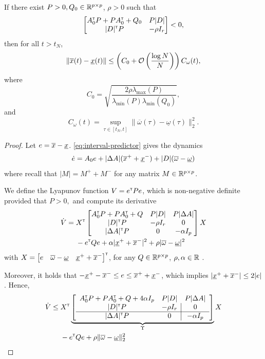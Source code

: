 \begin{subappendices}
	\begin{lemma}
		\begin{leftbar}[lemmabar]
		If there exist $P>0,Q_0\in\mathbb{R}^{p\times p}$, $\rho>0$ such that
		\begin{align*}
		\begin{bmatrix}
		A_0^{\mathsf{\scriptscriptstyle T}} P + P A_0^{\mathsf{\scriptscriptstyle T}} + Q_0 & P|D|  \\
		|D|^{\mathsf{\scriptscriptstyle T}} P & -\rho I_r \\
		\end{bmatrix}< 0,
		\end{align*}
		then for all $t> t_N$,
		\[\|\overline{x}(t) - \underline{x}(t)\| \leq \left(C_0 + \mathcal{O}\left({\frac{\log N}{N}} \right)\right)C_\omega(t), \]
		where $$C_0 = \sqrt{\frac{2\rho\lambda_{\max}(P)}{\lambda_{\min}(P)\lambda_{\min}(Q_0)}},$$ and $$C_\omega(t) = \sup_{\tau\in[t_N,t]} \|\overline{\omega}(\tau) - \underline{\omega}(\tau)\|_2^2.$$
		\end{leftbar}
	\end{lemma}
	\begin{proof}
		Let $e = \overline{x} - \underline{x}$. \eqref{eq:interval-predictor} gives the dynamics
		\begin{align*}
		\dot{e} = A_0e + |\Delta A|(\overline{x}^+ + \underline{x}^-) + |D|(\overline{\omega} - \underline{\omega})
		\end{align*}
		where recall that $|M| = M^+ + M^-$ for any matrix $M\in\mathbb{R}^{p\times p}$.
		
		We define the Lyapunov function $V = e^{\mathsf{\scriptscriptstyle T}} P e$, which is non-negative definite provided that
		$
		P>0,
		$ and compute its derivative
		\begin{align*}
		\dot{V} ={}& X^{\mathsf{\scriptscriptstyle T}}
		\begin{bmatrix}
		A_0^{\mathsf{\scriptscriptstyle T}} P + P A_0^{\mathsf{\scriptscriptstyle T}} + Q & P|D| & P|\Delta A| \\
		|D|^{\mathsf{\scriptscriptstyle T}} P & -\rho I_r & 0\\
		|\Delta A|^{\mathsf{\scriptscriptstyle T}} P & 0 & -\alpha I_p
		\end{bmatrix}
		X\\
		& - e^{\mathsf{\scriptscriptstyle T}} Q e + \alpha |\underline{x}^+ + \overline{x}^-|^2 + \rho |\overline{\omega} - \underline{\omega}|^2
		\end{align*}
		with $X=\begin{bmatrix}
		e & \overline{\omega} - \underline{\omega} &  \underline{x}^+ + \overline{x}^-
		\end{bmatrix}^{\mathsf{\scriptscriptstyle T}}$, for any $Q\in\mathbb{R}^{p\times p}$, $\rho,\alpha\in\mathbb{R}$ . 
		
		Moreover, it holds that $-\underline{x}^+ -\overline{x}^- \leq e \leq \overline{x}^+ + \underline{x}^-$, which implies $|\underline{x}^+ + \overline{x}^-| \leq 2 |e|$. Hence,
		\begin{align*}
		\dot{V} \leq {}& X^{\mathsf{\scriptscriptstyle T}}
		\underbrace{
			\left[
			\begin{array}{cc|c}
			A_0^{\mathsf{\scriptscriptstyle T}} P + P A_0^{\mathsf{\scriptscriptstyle T}} + Q + 4\alpha I_p & P|D| & P|\Delta A| \\
			|D|^{\mathsf{\scriptscriptstyle T}} P & -\rho I_r & 0\\
			\hline
			|\Delta A|^{\mathsf{\scriptscriptstyle T}} P & 0 & -\alpha I_p
			\end{array}
			\right]}_{\Upsilon}
		X\\
		& - e^{\mathsf{\scriptscriptstyle T}} Q e + \rho \|\overline{\omega} - \underline{\omega}\|_2^2
		\end{align*}
		

\end{proof}
\end{subappendices}
